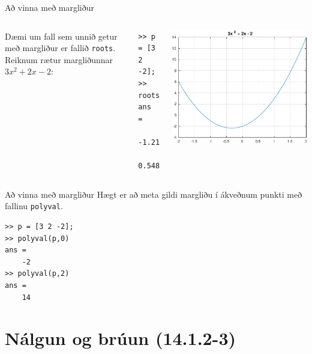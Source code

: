 \documentclass{beamer}
\begin{document}
\begin{frame}[fragile]{Að vinna með margliður}
\begin{columns}
Dæmi um fall sem unnið getur með margliður er fallið \texttt{roots}. Reiknum rætur margliðunnar $3x^2 + 2x - 2$:
\begin{verbatim}
>> p = [3 2 -2];
>> roots(p)
ans =
   -1.2153
    0.5486
\end{verbatim}
\includegraphics[width=\linewidth]{Pics/poly-example}
\end{columns}
\end{frame}

\begin{frame}[fragile]{Að vinna með margliður}
Hægt er að meta gildi margliðu í ákveðnum punkti með fallinu \texttt{polyval}.
\begin{verbatim}
>> p = [3 2 -2];
>> polyval(p,0)
ans =
    -2
>> polyval(p,2)
ans =
    14
\end{verbatim}
\end{frame}

\section{Nálgun og brúun (14.1.2-3)}
\end{document}
